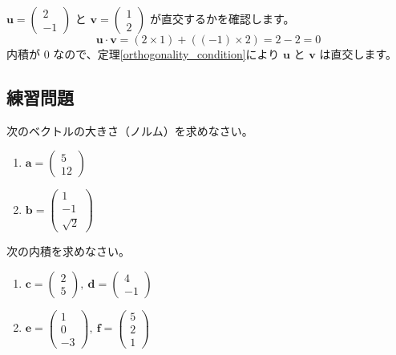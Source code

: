 \begin{ex}
$\bm{u} = \begin{pmatrix} 2 \\ -1 \end{pmatrix}$ と $\bm{v} = \begin{pmatrix} 1 \\ 2 \end{pmatrix}$ が直交するかを確認します。
\[\bm{u} \cdot \bm{v} = (2 \times 1) + ((-1) \times 2) = 2 - 2 = 0\]
内積が $0$ なので、定理\ref{orthogonality_condition}により $\bm{u}$ と $\bm{v}$ は直交します。
\end{ex}

\subsection{練習問題}
\begin{quiz}
次のベクトルの大きさ（ノルム）を求めなさい。
\begin{enumerate}
\item $\bm{a} = \begin{pmatrix} 5 \\ 12 \end{pmatrix}$
\item $\bm{b} = \begin{pmatrix} 1 \\ -1 \\ \sqrt{2} \end{pmatrix}$
\end{enumerate}
\end{quiz}

\begin{quiz}
次の内積を求めなさい。
\begin{enumerate}
\item $\bm{c} = \begin{pmatrix} 2 \\ 5 \end{pmatrix},\ \bm{d} = \begin{pmatrix} 4 \\ -1 \end{pmatrix}$
\item $\bm{e} = \begin{pmatrix} 1 \\ 0 \\ -3 \end{pmatrix},\ \bm{f} = \begin{pmatrix} 5 \\ 2 \\ 1 \end{pmatrix}$
\end{enumerate}
\end{quiz}

